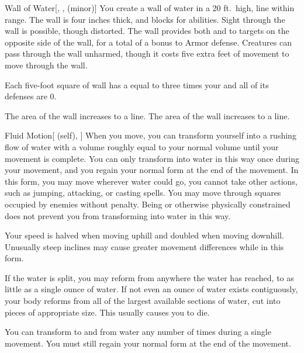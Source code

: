 \lowercase{\hypertarget{spell:Wall of Water}{}}\label{spell:Wall of Water}
\begin{freeability}[Rank 4]{\hypertarget{spell:Wall of Water}{Wall of Water}}[, ,  (minor)]
\targetrule
You create a wall of water in a 20 ft.\ high, \arealarge line within \rngmed range.
The wall is four inches thick, and blocks  for abilities.
Sight through the wall is possible, though distorted.
The wall provides both  and  to targets on the opposite side of the wall, for a total of a  bonus to Armor defense.
Creatures can pass through the wall unharmed, though it costs five extra feet of movement to move through the wall.

Each five-foot square of wall has a  equal to three times your  and all of its defenses are 0.

\rankline
{} The area of the wall increases to a \areahuge line.
 The area of the wall increases to a \areaext line.
\end{freeability}
\vspace{0.25em}



\lowercase{\hypertarget{spell:Fluid Motion}{}}\label{spell:Fluid Motion}
\begin{attuneability}[Rank 5]{\hypertarget{spell:Fluid Motion}{Fluid Motion}}[ (self), ]
When you move, you can transform yourself into a rushing flow of water with a volume roughly equal to your normal volume until your movement is complete.
You can only transform into water in this way once during your movement, and you regain your normal form at the end of the movement.
In this form, you may move wherever water could go, you cannot take other actions, such as jumping, attacking, or casting spells.
You may move through squares occupied by enemies without penalty.
Being  or otherwise physically constrained does not prevent you from transforming into water in this way.

Your speed is halved when moving uphill and doubled when moving downhill.
Unusually steep inclines may cause greater movement differences while in this form.

If the water is split, you may reform from anywhere the water has reached, to as little as a single ounce of water.
If not even an ounce of water exists contiguously, your body reforms from all of the largest available sections of water, cut into pieces of appropriate size.
This usually causes you to die.

\rankline
{} You can transform to and from water any number of times during a single movement.
You must still regain your normal form at the end of the movement.
\end{attuneability}
\vspace{0.25em}



